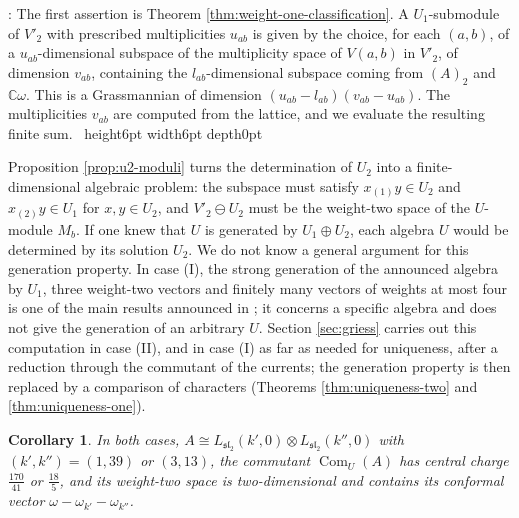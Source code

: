 \documentclass[leqno]{article}
\newcommand{\Cbb}{\ensuremath{\mathbb{C}}}
\newcommand{\qed}{\hfill \vrule height6pt  width6pt depth0pt}
\newcommand{\ot}{\otimes}
\newtheorem{cor}[thm]{Corollary}
\newenvironment{proof}[1][]{\noindent {\it Proof #1} : }{\hbox{~}\qed
\smallskip
}
\numberwithin{equation}{section}
\begin{document}
\begin{proof}
The first assertion is Theorem \ref{thm:weight-one-classification}. A $U_1$-submodule of $V'_2$ with prescribed multiplicities $u_{ab}$ is given by the choice, for each $(a,b)$, of a $u_{ab}$-dimensional subspace of the multiplicity space of $V(a,b)$ in $V'_2$, of dimension $v_{ab}$, containing the $l_{ab}$-dimensional subspace coming from $(A)_2$ and $\Cbb\omega$. This is a Grassmannian of dimension $(u_{ab}-l_{ab})(v_{ab}-u_{ab})$. The multiplicities $v_{ab}$ are computed from the lattice, and we evaluate the resulting finite sum.
\end{proof}

Proposition \ref{prop:u2-moduli} turns the determination of $U_2$ into a finite-dimensional algebraic problem: the subspace must satisfy $x_{(1)}y \in U_2$ and $x_{(2)}y \in U_1$ for $x, y \in U_2$, and $V'_2 \ominus U_2$ must be the weight-two space of the $U$-module $M_b$. If one knew that $U$ is generated by $U_1 \oplus U_2$, each algebra $U$ would be determined by its solution $U_2$. We do not know a general argument for this generation property. In case (I), the strong generation of the announced algebra by $U_1$, three weight-two vectors and finitely many vectors of weights at most four is one of the main results announced in \cite{Rie26}; it concerns a specific algebra and does not give the generation of an arbitrary $U$. Section \ref{sec:griess} carries out this computation in case (II), and in case (I) as far as needed for uniqueness, after a reduction through the commutant of the currents; the generation property is then replaced by a comparison of characters (Theorems \ref{thm:uniqueness-two} and \ref{thm:uniqueness-one}).

\begin{cor}
\label{cor:affine-commutant}
In both cases, $A \cong L_{\mathfrak{sl}_2}(k',0) \ot L_{\mathfrak{sl}_2}(k'',0)$ with $(k',k'') = (1,39)$ or $(3,13)$, the commutant $\operatorname{Com}_U(A)$ has central charge $\frac{170}{41}$ or $\frac{18}{5}$, and its weight-two space is two-dimensional and contains its conformal vector $\omega-\omega_{k'}-\omega_{k''}$.
\end{cor}
\end{document}
